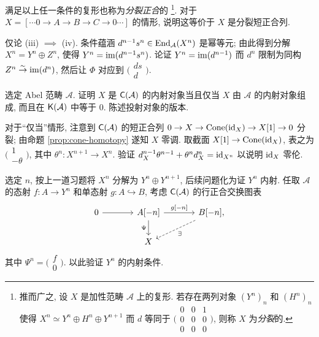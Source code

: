 \begin{Exercises}
	满足以上任一条件的复形也称为\emph{分裂正合}的
	\footnote{推而广之, 设 $X$ 是加性范畴 $\mathcal{A}$ 上的复形. 若存在两列对象 $(Y^n)_n$ 和 $(H^n)_n$ 使得 $X^n \simeq Y^n \oplus H^n \oplus Y^{n+1}$ 而 $d$ 等同于 $\bigl(\begin{smallmatrix} 0 & 0 & 1 \\ 0 & 0 & 0 \\ 0 & 0 & 0 \end{smallmatrix}\bigr)$, 则称 $X$ 为\emph{分裂}的.}.
	对于 $X = \left[ \cdots 0 \to A \to B \to C \to 0 \cdots\right]$ 的情形, 说明这等价于 $X$ 是分裂短正合列.
	
	\begin{hint}
		仅论 (iii) $\implies$ (iv). 条件蕴涵 $d^{n-1} s^n \in \operatorname{End}_{\mathcal{A}}(X^n)$ 是幂等元; 由此得到分解 $X^n = Y^n \oplus Z^n$, 使得 $Y^n = \operatorname{im}(d^{n-1} s^n)$. 论证 $Y^n = \operatorname{im}(d^{n-1})$ 而 $d^n$ 限制为同构 $Z^n \stackrel{\sim}{\rightarrow} \operatorname{im}(d^n)$, 然后让 $\Phi$ 对应到
		$\bigl( \begin{smallmatrix} ds \\ d \end{smallmatrix} \bigr)$.
	\end{hint}

	\item 选定 Abel 范畴 $\mathcal{A}$. 证明 $X$ 是 $\mathsf{C}(\mathcal{A})$ 的内射对象当且仅当 $X$ 由 $\mathcal{A}$ 的内射对象组成, 而且在 $\mathsf{K}(\mathcal{A})$ 中等于 $0$. 陈述投射对象的版本.
	
	\begin{hint}
		对于``仅当''情形, 注意到 $\mathsf{C}(\mathcal{A})$ 的短正合列 $0 \to X \to \operatorname{Cone}(\mathrm{id}_X) \to X[1] \to 0$ 分裂; 由命题 \ref{prop:cone-homotopy} 遂知 $X$ 零调. 取截面 $X[1] \to \operatorname{Cone}(\mathrm{id}_X)$, 表之为
		$\bigl(\begin{smallmatrix} 1 \\ -\theta \end{smallmatrix}\bigr)$, 其中 $\theta^n: X^{n+1} \to X^n$. 验证 $d_X^{n-1} \theta^{n-1} + \theta^n d_X^n = \mathrm{id}_{X^n}$ 以说明 $\mathrm{id}_X$ 零伦.
		
		选定 $n$, 按上一道习题将 $X^n$ 分解为 $Y^n \oplus Y^{n+1}$, 后续问题化为证 $Y^n$ 内射. 任取 $\mathcal{A}$ 的态射 $f: A \to Y^n$ 和单态射 $g: A \hookrightarrow B$, 考虑 $\mathsf{C}(\mathcal{A})$ 的行正合交换图表
		\[\begin{tikzcd}[column sep=large]
			0 \arrow[r] & {A[-n]} \arrow[r, "{g[-n]}"] \arrow[d, "\Psi"'] & {B[-n]}, \arrow[dashed, ld, "\exists"] \\
			& X &
		\end{tikzcd}\]
		其中 $\Psi^n = \big(\begin{smallmatrix} f \\ 0 \end{smallmatrix} \bigr)$. 以此验证 $Y^n$ 的内射条件.
		

\end{hint}
\end{Exercises}
